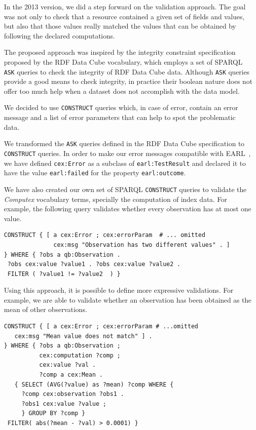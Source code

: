 \documentclass{llncs}
\begin{document}
In the 2013 version, we did a step forward on the validation approach. 
The goal was not only to check that a resource contained a given set of fields and values, but also that those values really matched
the values that can be obtained by following the declared computations.
 
The proposed approach was inspired by the integrity constraint specification proposed by the RDF Data Cube vocabulary, 
which employs a set of SPARQL
 \lstinline|ASK| queries to check the integrity of RDF Data Cube data. 
 Although \lstinline|ASK| queries provide a good means to check integrity, in
 practice their boolean nature does not offer too much help when a 
 dataset does not accomplish with the data model.

We decided to use \lstinline|CONSTRUCT| queries which, in case of error, 
  contain an error message and a list of error parameters that can help to spot
  the problematic data.

 We transformed the \lstinline|ASK| queries defined in the RDF Data Cube
 specification to \lstinline|CONSTRUCT| queries. 
In order to make our error messages compatible with EARL~\cite{EARL}, we have
 defined \lstinline|cex:Error| as a subclass of \lstinline|earl:TestResult| and 
 declared it to have the value \lstinline|earl:failed| for the property
 \lstinline|earl:outcome|.
 
We have also created our own set of SPARQL \lstinline|CONSTRUCT| queries to
validate the \emph{Computex} vocabulary terms, specially the computation of index data.
For example, the following query validates whether every observation 
  has at most one value.
 
\begin{lstlisting}[style=SPARQL]
CONSTRUCT { [ a cex:Error ; cex:errorParam  # ... omitted 
              cex:msg "Observation has two different values" . ]
} WHERE { ?obs a qb:Observation . 
 ?obs cex:value ?value1 . ?obs cex:value ?value2 .
 FILTER ( ?value1 != ?value2  ) }
\end{lstlisting}

Using this approach, it is possible to define more expressive validations.
For example, we are able to validate whether an observation has been obtained as
the mean of other observations. 

\begin{lstlisting}[style=SPARQL]
CONSTRUCT { [ a cex:Error ; cex:errorParam # ...omitted 
   cex:msg "Mean value does not match" ] . 
} WHERE { ?obs a qb:Observation ;
          cex:computation ?comp ;
          cex:value ?val .
          ?comp a cex:Mean .
   { SELECT (AVG(?value) as ?mean) ?comp WHERE {
     ?comp cex:observation ?obs1 .
	 ?obs1 cex:value ?value ;
     } GROUP BY ?comp } 
 FILTER( abs(?mean - ?val) > 0.0001) }
\end{lstlisting}
\end{document}
